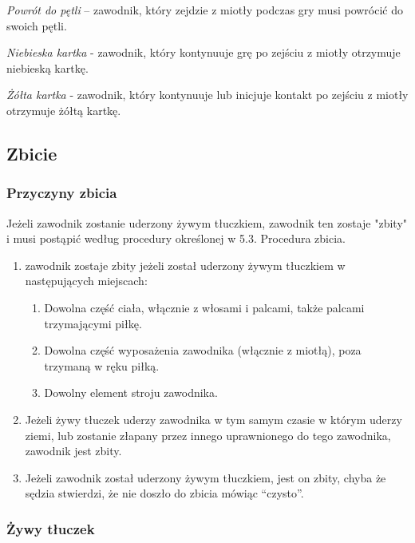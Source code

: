 \documentclass[12pt]{article}
\begin{document}
\emph{Powrót do pętli} -- zawodnik, który zejdzie z miotły podczas gry
musi powrócić do swoich pętli.

\emph{Niebieska kartka} - zawodnik, który kontynuuje grę po zejściu z
miotły otrzymuje niebieską kartkę.

\emph{Żółta kartka} - zawodnik, który kontynuuje lub inicjuje kontakt po
zejściu z miotły otrzymuje żółtą kartkę.

\subsection{Zbicie}

\subsubsection{Przyczyny zbicia}

Jeżeli zawodnik zostanie uderzony żywym tłuczkiem, zawodnik ten zostaje
"zbity" i musi postąpić
według procedury określonej w 5.3. Procedura zbicia.

\begin{enumerate}
	\item
	      zawodnik zostaje zbity jeżeli został uderzony żywym tłuczkiem w
	      następujących miejscach:

	      \begin{enumerate}
		      \item
		            Dowolna część ciała, włącznie z włosami i palcami, także palcami
		            trzymającymi piłkę.
		      \item
		            Dowolna część wyposażenia zawodnika (włącznie z miotłą), poza
		            trzymaną w ręku piłką.
		      \item
		            Dowolny element stroju zawodnika.
	      \end{enumerate}
	\item
	      Jeżeli żywy tłuczek uderzy zawodnika w tym samym czasie w którym
	      uderzy ziemi, lub zostanie złapany przez innego uprawnionego do tego
	      zawodnika, zawodnik jest zbity.
	\item
	      Jeżeli zawodnik został uderzony żywym tłuczkiem, jest on zbity, chyba
	      że sędzia stwierdzi, że nie doszło do zbicia mówiąc ``czysto''.
\end{enumerate}

\subsubsection{Żywy tłuczek}
\end{document}
